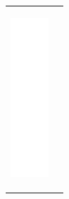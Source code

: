 \documentclass[11pt]{article}
\begin{document}
\begin{center}
\begin{tabular}{ll}
\begin{center}
\includegraphics[width=.9\linewidth]{chain2.png}

\end{center}
\end{tabular}
\end{center}
\end{document}

